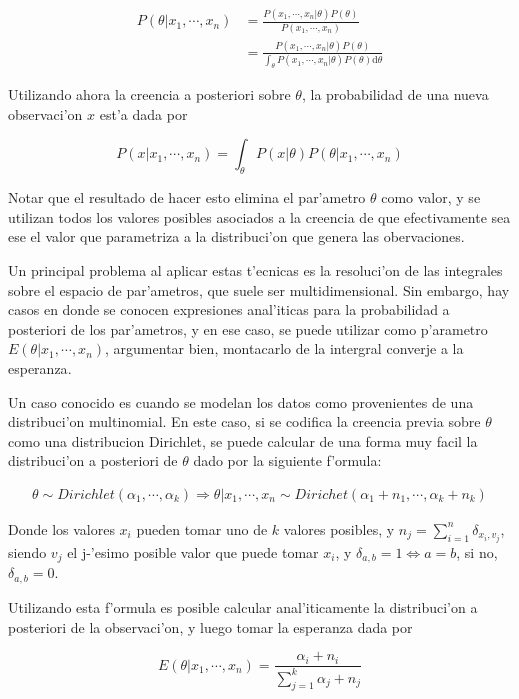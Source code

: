 \begin{align}
P(\theta|x_1,\cdots,x_n) &= \frac{P(x_1,\cdots,x_n|\theta) P(\theta)}{P(x_1,\cdots,x_n)} \\
                         &= \frac{P(x_1,\cdots,x_n|\theta) P(\theta)}{\int_\theta{P(x_1,\cdots,x_n|\theta)P(\theta)\mathrm{d}\theta}}
\end{align}

Utilizando ahora la creencia a posteriori sobre $\theta$, la probabilidad de una nueva observaci'on $x$ est'a dada por

$$P(x|x_1,\cdots,x_n) = \int_\theta{P(x|\theta)P(\theta|x_1,\cdots,x_n)}$$

Notar que el resultado de hacer esto elimina el par'ametro $\theta$ como valor, y se utilizan todos los valores posibles asociados a la creencia de que efectivamente
sea ese el valor que parametriza a la distribuci'on que genera las obervaciones.


Un principal problema al aplicar estas t'ecnicas es la resoluci'on de las integrales sobre el espacio de par'ametros, que suele ser multidimensional. 
Sin embargo, hay casos en donde se conocen expresiones anal'iticas para la probabilidad a posteriori de los par'ametros, y en ese caso, se puede utilizar
como p'arametro $E(\theta|x_1,\cdots,x_n)$, \alert{argumentar bien, montacarlo de la intergral converje a la esperanza}.

Un caso conocido es cuando se modelan los datos como provenientes de una distribuci'on multinomial. En este caso, si se codifica la creencia previa
sobre $\theta$ como una distribucion Dirichlet, se puede calcular de una forma muy facil la distribuci'on a posteriori de $\theta$ dado por la siguiente
f'ormula:

\begin{align}
    \theta \sim Dirichlet(\alpha_1,\cdots,\alpha_k) \Rightarrow \theta|x_1,\cdots,x_n \sim Dirichet(\alpha_1+n_1,\cdots,\alpha_k+n_k)
\end{align}

Donde los valores $x_i$ pueden tomar uno de $k$ valores posibles, y $n_j=\sum_{i=1}^n\delta_{x_i, v_j}$, siendo $v_j$ el j-'esimo posible valor que puede tomar $x_i$, y
$\delta_{a,b} = 1 \Leftrightarrow a = b$, si no, $\delta_{a, b} = 0$. 

Utilizando esta f'ormula es posible calcular anal'iticamente la distribuci'on a posteriori de la observaci'on, y luego tomar la esperanza dada por

$$E(\theta|x_1,\cdots,x_n)=\frac{\alpha_i + n_i}{\sum_{j=1}^{k}{\alpha_j+n_j}}$$

